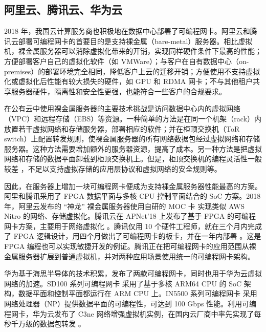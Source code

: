 \subsection{阿里云、腾讯云、华为云}

2018 年，我国云计算服务商也积极地在数据中心部署了可编程网卡。阿里云和腾讯云部署可编程网卡的首要目的是支持裸金属（bare-metal）服务器。相比虚拟机，裸金属服务器可以消除虚拟化带来的开销，实现同样硬件条件下最高的性能；方便部署客户自己的虚拟化软件（如 VMWare）；与客户在自有数据中心（on-premises）的部署环境完全相同，降低客户上云的迁移开销；方便使用不支持虚拟化或虚拟化后性能有较大损失的硬件，如 GPU 和 RDMA 网卡；不与其他租户共享服务器硬件，隔离性和安全性更强，也能符合一些客户的合规要求。

在公有云中使用裸金属服务器的主要技术挑战是访问数据中心内的虚拟网络（VPC）和远程存储（EBS）等资源。一种简单的方法是在同一个机架（rack）内放置若干虚拟网络和存储服务器，部署相应的软件；并在柜顶交换机（ToR switch）上配置转发规则，使裸金属服务器的所有网络数据包经过虚拟网络和存储服务器。这种方法需要增加额外的服务器资源，提高了成本。另一种方法是把虚拟网络和存储的数据平面卸载到柜顶交换机上。但是，柜顶交换机的编程灵活性一般较差 \cite{tencent-smartnic}，不足以支持虚拟存储的应用层协议和虚拟网络的安全规则等。

因此，在服务器上增加一块可编程网卡便成为支持裸金属服务器性能最高的方案。阿里和腾讯采用了 FPGA 数据平面与多核 CPU 控制平面结合的 SoC 方案。2018 年，阿里云发布的 ``神龙'' 裸金属服务器使用自研的 MOC 卡 \cite{alicloud-smartnic,alicloud-xdragon} 实现类似 AWS Nitro 的网络、存储虚拟化。腾讯云在 APNet’18 上发布了基于 FPGA 的可编程网卡方案，主要用于网络虚拟化 \cite{tencent-smartnic}。腾讯仅用 10 个硬件工程师，就在三个月内完成了 FPGA 逻辑设计，用四个月做出了可编程网卡的板卡，并在一年内部署 \cite{tencent-smartnic}。这是 FPGA 编程也可以实现敏捷开发的例证。腾讯正在把可编程网卡的应用范围从裸金属服务器扩展到普通虚拟机，并对两种应用场景使用统一的可编程网卡架构。

华为基于海思半导体的技术积累，发布了两款可编程网卡，同时也用于华为云虚拟网络的加速。SD100 系列可编程网卡 \cite{sd100} 采用了基于多核 ARM64 CPU 的 SoC 架构，数据平面和控制平面都运行在 ARM CPU 上。IN5500 系列可编程网卡 \cite{in200} 采用网络处理器（NP）提供数据平面的可编程性，可达到 100 Gbps 性能。利用可编程网卡，华为云发布了 C3ne 网络增强虚拟机实例，在国内云厂商中率先实现了每秒千万级的数据包转发 \cite{huawei-smartnic}。
